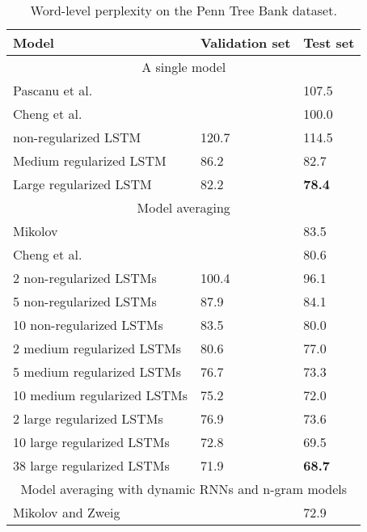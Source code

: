 \documentclass{article} %
\begin{document}
	\begin{table}[t]
		\small
		\centering
		\renewcommand{\arraystretch}{1.15}
		\begin{tabular}{lll}
			\hline
			Model & Validation set & Test set \\
			\hline
			\multicolumn{3}{c}{A single model} \\
			\hline
			Pascanu et al.~\cite{pascanu2013construct} & & 107.5 \\
			Cheng et al.~\cite{chenglanguage} & & 100.0 \\
			non-regularized LSTM & 120.7 & 114.5 \\
			Medium regularized LSTM & 86.2 & 82.7 \\
			Large regularized LSTM & 82.2 & {\bf 78.4} \\
			\hline
			\multicolumn{3}{c}{Model averaging} \\
			\hline
			Mikolov \cite{mikolov2012statistical} & & 83.5 \\
			Cheng et al.~\cite{chenglanguage} & & 80.6 \\
			2 non-regularized LSTMs & 100.4 & 96.1 \\
			5 non-regularized LSTMs & 87.9 & 84.1 \\
			10 non-regularized LSTMs & 83.5 & 80.0 \\
			2 medium regularized LSTMs & 80.6 & 77.0 \\
			5 medium regularized LSTMs & 76.7 & 73.3 \\
			10 medium regularized LSTMs & 75.2 & 72.0 \\
			2 large regularized LSTMs & 76.9 & 73.6 \\
			10 large regularized LSTMs & 72.8 & 69.5 \\
			38 large regularized LSTMs & 71.9 & {\bf 68.7} \\
			\hline
			\multicolumn{3}{c}{Model averaging with dynamic RNNs and n-gram models} \\
			\hline
			Mikolov and Zweig \cite{mikolov2012context} & & 72.9 \\
			\hline
		\end{tabular}
		\caption{Word-level perplexity on the Penn Tree Bank dataset.}
		\label{tab:ptb}
	\end{table}
	
\end{document}
